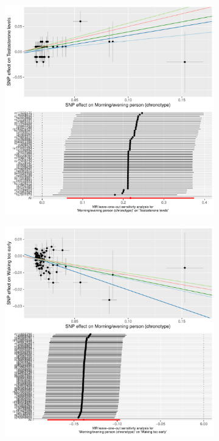 \documentclass[journal,article,submit,moreauthors,pdftex]{Definitions/mdpi}
\begin{document}
\begin{figure}[htbp]
     \centering
     \begin{subfigure}[b]{0.4\textwidth}
         \centering
         \includegraphics[width=\textwidth]{Figs/Analysis2/Morning_evening_person_(chronotype)_vs_Testosterone_levels.Plots.pdf}
         \caption{}
         \label{testosterone}
     \end{subfigure}
     \begin{subfigure}[b]{0.4\textwidth}
         \centering
         \includegraphics[width=\textwidth]{Figs/Analysis2/Morning_evening_person_(chronotype)_vs_Waking_too_early.Plots.pdf}

\end{subfigure}
\end{figure}
\end{document}
